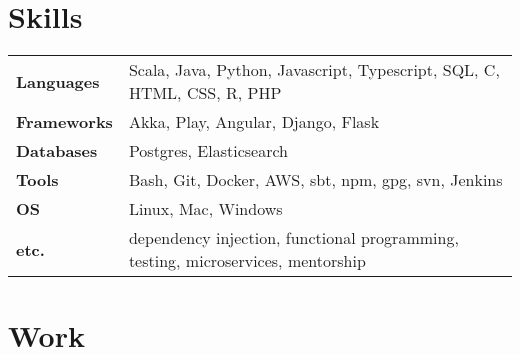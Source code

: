 \documentclass[10pt,letterpaper]{article}
\begin{document}
  \setcounter{secnumdepth}{0}

  \section{Skills}

  \noindent
  \begin{tabularx}{\textwidth}{@{}lX@{}}
    \textbf{Languages} & Scala, Java, Python, Javascript, Typescript, SQL, C, HTML, CSS, R, PHP \\
    \textbf{Frameworks} & Akka, Play, Angular, Django, Flask \\
    \textbf{Databases} & Postgres, Elasticsearch \\
    \textbf{Tools} & Bash, Git, Docker, AWS, sbt, npm, gpg, svn, Jenkins \\
    \textbf{OS} & Linux, Mac, Windows \\
    \textbf{etc.} & dependency injection, functional programming, testing, microservices, mentorship
  \end{tabularx}

  \section{Work}
\end{document}
